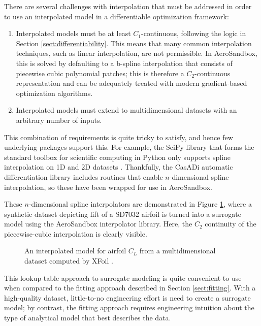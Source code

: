 There are several challenges with interpolation that must be addressed in order to use an interpolated model in a differentiable optimization framework:

\begin{enumerate}
    \item Interpolated models must be at least $C_1$-continuous, following the logic in Section \ref{sect:differentiability}. This means that many common interpolation techniques, such as linear interpolation, are not permissible. In AeroSandbox, this is solved by defaulting to a b-spline interpolation that consists of piecewise cubic polynomial patches; this is therefore a $C_2$-continuous representation and can be adequately treated with modern gradient-based optimization algorithms.
    \item Interpolated models must extend to multidimensional datasets with an arbitrary number of inputs.
\end{enumerate}

This combination of requirements is quite tricky to satisfy, and hence few underlying packages support this. For example, the SciPy library that forms the standard toolbox for scientific computing in Python only supports spline interpolation on 1D and 2D datasets \cite{scipy}. Thankfully, the CasADi automatic differentiation library \cite{casadi} includes routines that enable $n$-dimensional spline interpolation, so these have been wrapped for use in AeroSandbox.

These $n$-dimensional spline interpolators are demonstrated in Figure \ref{fig:interpolated-xfoil-3d}, where a synthetic dataset depicting lift of a SD7032 airfoil is turned into a surrogate model using the AeroSandbox interpolator library. Here, the $C_2$ continuity of the piecewise-cubic interpolation is clearly visible.

\begin{figure}[H]
    \centering
%    
    \ifdraft{}{}
    \caption{An interpolated model for airfoil $C_L$ from a multidimensional dataset computed by XFoil \cite{xfoil}.}
    \label{fig:interpolated-xfoil-3d}
\end{figure}

This lookup-table approach to surrogate modeling is quite convenient to use when compared to the fitting approach described in Section \ref{sect:fitting}. With a high-quality dataset, little-to-no engineering effort is need to create a surrogate model; by contrast, the fitting approach requires engineering intuition about the type of analytical model that best describes the data.

